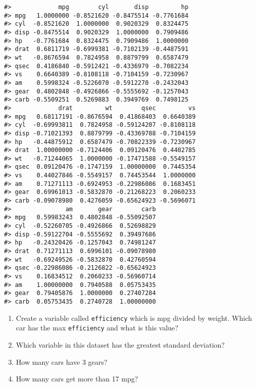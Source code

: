 \documentclass[
]{book}
\providecommand{\tightlist}{%
  \setlength{\itemsep}{0pt}\setlength{\parskip}{0pt}}
\begin{document}
\begin{verbatim}
#>             mpg        cyl       disp         hp
#> mpg   1.0000000 -0.8521620 -0.8475514 -0.7761684
#> cyl  -0.8521620  1.0000000  0.9020329  0.8324475
#> disp -0.8475514  0.9020329  1.0000000  0.7909486
#> hp   -0.7761684  0.8324475  0.7909486  1.0000000
#> drat  0.6811719 -0.6999381 -0.7102139 -0.4487591
#> wt   -0.8676594  0.7824958  0.8879799  0.6587479
#> qsec  0.4186840 -0.5912421 -0.4336979 -0.7082234
#> vs    0.6640389 -0.8108118 -0.7104159 -0.7230967
#> am    0.5998324 -0.5226070 -0.5912270 -0.2432043
#> gear  0.4802848 -0.4926866 -0.5555692 -0.1257043
#> carb -0.5509251  0.5269883  0.3949769  0.7498125
#>             drat         wt        qsec         vs
#> mpg   0.68117191 -0.8676594  0.41868403  0.6640389
#> cyl  -0.69993811  0.7824958 -0.59124207 -0.8108118
#> disp -0.71021393  0.8879799 -0.43369788 -0.7104159
#> hp   -0.44875912  0.6587479 -0.70822339 -0.7230967
#> drat  1.00000000 -0.7124406  0.09120476  0.4402785
#> wt   -0.71244065  1.0000000 -0.17471588 -0.5549157
#> qsec  0.09120476 -0.1747159  1.00000000  0.7445354
#> vs    0.44027846 -0.5549157  0.74453544  1.0000000
#> am    0.71271113 -0.6924953 -0.22986086  0.1683451
#> gear  0.69961013 -0.5832870 -0.21268223  0.2060233
#> carb -0.09078980  0.4276059 -0.65624923 -0.5696071
#>               am       gear        carb
#> mpg   0.59983243  0.4802848 -0.55092507
#> cyl  -0.52260705 -0.4926866  0.52698829
#> disp -0.59122704 -0.5555692  0.39497686
#> hp   -0.24320426 -0.1257043  0.74981247
#> drat  0.71271113  0.6996101 -0.09078980
#> wt   -0.69249526 -0.5832870  0.42760594
#> qsec -0.22986086 -0.2126822 -0.65624923
#> vs    0.16834512  0.2060233 -0.56960714
#> am    1.00000000  0.7940588  0.05753435
#> gear  0.79405876  1.0000000  0.27407284
#> carb  0.05753435  0.2740728  1.00000000
\end{verbatim}

\begin{enumerate}
\def\labelenumi{\arabic{enumi}.}
\setcounter{enumi}{5}
\tightlist
\item
  Create a variable called \texttt{efficiency} which is mpg divided by weight. Which car has the max \texttt{efficiency} and what is this value?
\item
  Which variable in this dataset has the greatest standard deviation?
\item
  How many cars have 3 gears?
\item
  How many cars get more than 17 mpg?
\end{enumerate}
\end{document}
